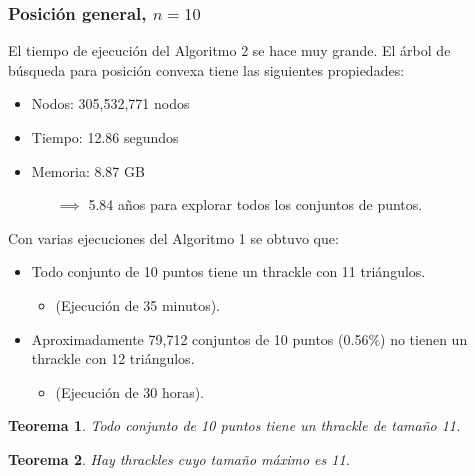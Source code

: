 \documentclass{beamer}
\newtheorem{teo}{Teorema}
\begin{document}

\begin{frame}
  \frametitle{Posición general, $n=10$}
  El tiempo de ejecución del Algoritmo 2 se hace muy grande. El árbol de
  búsqueda para posición convexa tiene las siguientes propiedades:
  \begin{itemize}
    \item Nodos: 305,532,771 nodos
    \item Tiempo: 12.86 segundos
    \item Memoria: 8.87 GB
      \begin{itemize}[leftmargin=1.5cm]
        \item[$\implies$] 5.84 años para explorar todos los conjuntos de puntos.
      \end{itemize}
  \end{itemize}
  \begin{overprint}
    Con varias ejecuciones del Algoritmo 1 se obtuvo que:
    \begin{itemize}
      \item Todo conjunto de 10 puntos tiene un thrackle con 11 triángulos.
        \begin{itemize}[leftmargin=1cm]
          \item (Ejecución de 35 minutos).
        \end{itemize}
      \item Aproximadamente 79,712 conjuntos de 10 puntos (0.56\%) no tienen un
        thrackle con 12 triángulos.
        \begin{itemize}[leftmargin=1cm]
          \item (Ejecución de 30 horas).
        \end{itemize}
    \end{itemize}
    \begin{teo}
      Todo conjunto de 10 puntos tiene un thrackle de tamaño 11.
    \end{teo}
    \vspace{0.5cm}
    \begin{teo}
      Hay thrackles cuyo tamaño máximo es 11.
    \end{teo}
  \end{overprint}
\end{frame}
\end{document}

